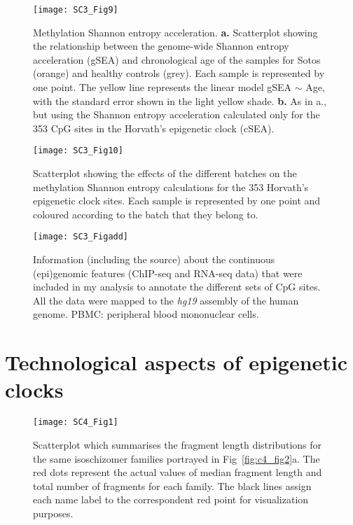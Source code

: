 \begin{figure}[htbp!] 
	\centering    
	\texttt{[image: SC3\_Fig9]}
	\caption[Methylation Shannon entropy acceleration]{Methylation Shannon entropy acceleration. \textbf{a.} Scatterplot showing the relationship between the genome-wide Shannon entropy acceleration (\acrshort{gSEA}) and chronological age of the samples for Sotos (orange) and healthy controls (grey). Each sample is represented by one point. The yellow line represents the linear model gSEA $\sim$ Age, with the standard error shown in the light yellow shade. \textbf{b.} As in a., but using the Shannon entropy acceleration calculated only for the 353 CpG sites in the Horvath's epigenetic clock (\acrshort{cSEA}).}
	\label{fig:sc3_fig9}
\end{figure}

\begin{figure}[htbp!] 
	\centering    
	\texttt{[image: SC3\_Fig10]}
	\caption[Batch effects in the methylation Shannon entropy for the epigenetic clock sites]{Scatterplot showing the effects of the different batches on the methylation Shannon entropy calculations for the 353 Horvath's epigenetic clock sites. Each sample is represented by one point and coloured according to the batch that they belong to. }
	\label{fig:sc3_fig10}
\end{figure}

		

\begin{figure}[htbp!] 
	\centering    
	\texttt{[image: SC3\_Figadd]}
	\caption[Information for the continuous (epi)genomic features]{Information (including the source) about the continuous (epi)genomic features (\acrshort{ChIP-seq} and \acrshort{RNA-seq} data) that were included in my analysis to annotate the different sets of CpG sites. All the data were mapped to the \textit{\acrshort{hg19}} assembly of the human genome. \acrshort{PBMC}: peripheral blood mononuclear cells.}
	\label{fig:sc3_figadd}
\end{figure}

\clearpage

\renewcommand{\thesection}{S.3}   
\section{Technological aspects of epigenetic clocks}

\renewcommand\thefigure{S3.\arabic{figure}}    
\bigskip

\begin{figure}[htbp!] 
	\centering    
	\setcounter{figure}{0}
	\texttt{[image: SC4\_Fig1]}
	\caption[Scatterplot of fragment length distributions for the isoschizomer families]{Scatterplot which summarises the fragment length distributions for the same isoschizomer families portrayed in Fig~\ref{fig:c4_fig2}a. The red dots represent the actual values of median fragment length and total number of fragments for each family. The black lines assign each name label to the correspondent red point for visualization purposes.}
	\label{fig:sc4_fig1}
\end{figure}

